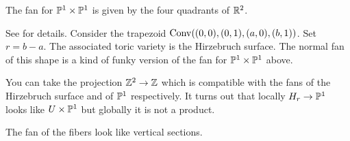 \begin{example}
The fan for $\mathbb{P}^1\times\mathbb{P}^1$ is given by the four quadrants of $\mathbb{R}^2$.
\end{example}

\begin{example}
See \cite{cox2011toric} for details. Consider the trapezoid $\operatorname{Conv}((0,0), (0,1), (a,0), (b, 1))$. Set $r=b-a$. The associated toric variety is the Hirzebruch surface. The normal fan of this shape is a kind of funky version of the fan for $\mathbb{P}^1\times \mathbb{P}^1$ above.

You can take the projection $\mathbb{Z}^2\to \mathbb{Z}$ which is compatible with the fans of the Hirzebruch surface and of $\mathbb{P}^1$ respectively. It turns out that locally $H_r\to \mathbb{P}^1$ looks like $U\times \mathbb{P}^1$ but globally it is not a product.

The fan of the fibers look like vertical sections.
\end{example}








